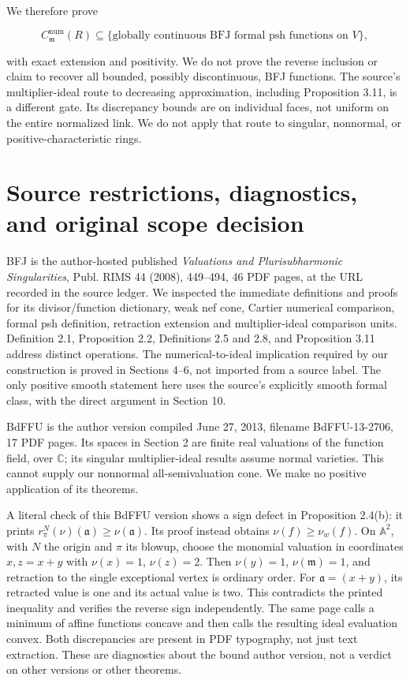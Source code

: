 \documentclass[11pt]{article}
\begin{document}
We therefore prove

\[
C^{\mathrm{num}}_{\mathfrak m}(R)
\subseteq\{\text{globally continuous BFJ formal psh functions on }V\},
\]

with exact extension and positivity. We do not prove the reverse inclusion or claim to recover all bounded, possibly discontinuous, BFJ functions. The source's multiplier-ideal route to decreasing approximation, including Proposition 3.11, is a different gate. Its discrepancy bounds are on individual faces, not uniform on the entire normalized link. We do not apply that route to singular, nonnormal, or positive-characteristic rings.

\section{Source restrictions, diagnostics, and original scope decision}

BFJ is the author-hosted published \emph{Valuations and Plurisubharmonic Singularities}, Publ. RIMS 44 (2008), 449--494, 46 PDF pages, at the URL recorded in the source ledger. We inspected the immediate definitions and proofs for its divisor/function dictionary, weak nef cone, Cartier numerical comparison, formal psh definition, retraction extension and multiplier-ideal comparison units. Definition 2.1, Proposition 2.2, Definitions 2.5 and 2.8, and Proposition 3.11 address distinct operations. The numerical-to-ideal implication required by our construction is proved in Sections 4--6, not imported from a source label. The only positive smooth statement here uses the source's explicitly smooth formal class, with the direct argument in Section 10.

BdFFU is the author version compiled June 27, 2013, filename BdFFU-13-2706, 17 PDF pages. Its spaces in Section 2 are finite real valuations of the function field, over \(\mathbb C\); its singular multiplier-ideal results assume normal varieties. This cannot supply our nonnormal all-semivaluation cone. We make no positive application of its theorems.

A literal check of this BdFFU version shows a sign defect in Proposition 2.4(b): it prints \(r_\pi^N(\nu)(\mathfrak a)\geq\nu(\mathfrak a)\). Its proof instead obtains \(\nu(f)\geq\nu_w(f)\). On \(\mathbb A^2\), with \(N\) the origin and \(\pi\) its blowup, choose the monomial valuation in coordinates \(x,z=x+y\) with \(\nu(x)=1\), \(\nu(z)=2\). Then \(\nu(y)=1\), \(\nu(\mathfrak m)=1\), and retraction to the single exceptional vertex is ordinary order. For \(\mathfrak a=(x+y)\), its retracted value is one and its actual value is two. This contradicts the printed inequality and verifies the reverse sign independently. The same page calls a minimum of affine functions concave and then calls the resulting ideal evaluation convex. Both discrepancies are present in PDF typography, not just text extraction. These are diagnostics about the bound author version, not a verdict on other versions or other theorems.
\end{document}
